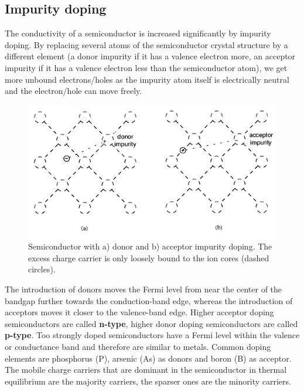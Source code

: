 \documentclass[report]{subfiles}
\begin{document}
\subsection{Impurity doping}

The conductivity of a semiconductor is increased significantly by impurity doping. By replacing several atoms of the semiconductor crystal structure by a different element (a donor impurity if it has a valence electron more, an acceptor impurity if it has a valence electron less than the semiconductor atom), we get more unbound electrons/holes as the impurity atom itself is electrically neutral and the electron/hole can move freely.

\begin{figure}[H]
\centering
\includegraphics[scale=0.4]{pics/impurity_doping.png}
\caption{Semiconductor with a) donor and b) acceptor impurity doping. The excess charge carrier is only loosely bound to the ion cores (dashed circles).}
\end{figure}

The introduction of donors moves the Fermi level from near the center of the bandgap further towards the conduction-band edge, whereas the
introduction of acceptors moves it closer to the valence-band edge. Higher acceptor doping semiconductors are called \textbf{n-type}, higher donor doping semiconductors are called \textbf{p-type}. Too strongly doped semiconductors have a Fermi level within the valence or conductance band and therefore are similar to metals. Common doping elements are phosphorus (P), arsenic (As) as donors and boron (B) as acceptor.\\
The mobile charge carriers that are dominant in the semiconductor in thermal equilibrium are the majority carriers, the sparser ones are the minority carriers.
\end{document}
